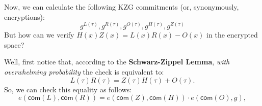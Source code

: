 \documentclass{zkdl-presentation-template}
\begin{document}
    \begin{frame}
        Now, we can calculate the following KZG commitments (or, synonymously, encryptions):
        \begin{equation*}
            g^{L(\tau)}, g^{R(\tau)}, g^{O(\tau)}, g^{H(\tau)}, g^{Z(\tau)}
        \end{equation*}
        But how can we verify $H(x)Z(x) = L(x)R(x) - O(x)$ in the encrypted space? 
        
        Well, first notice that, according to the \textbf{Schwarz-Zippel Lemma}, \textit{with overwhelming probability} the check is equivalent to:
        \begin{equation*}
            L(\tau)R(\tau) = Z(\tau)H(\tau) + O(\tau).
        \end{equation*}
        So, we can check this equality as follows:
        \begin{equation*}
            e(\mathsf{com}(L), \mathsf{com}(R)) = e(\mathsf{com}(Z), \mathsf{com}(H)) \cdot e(\mathsf{com}(O), g),
        \end{equation*}
    \end{frame}
\end{document}

